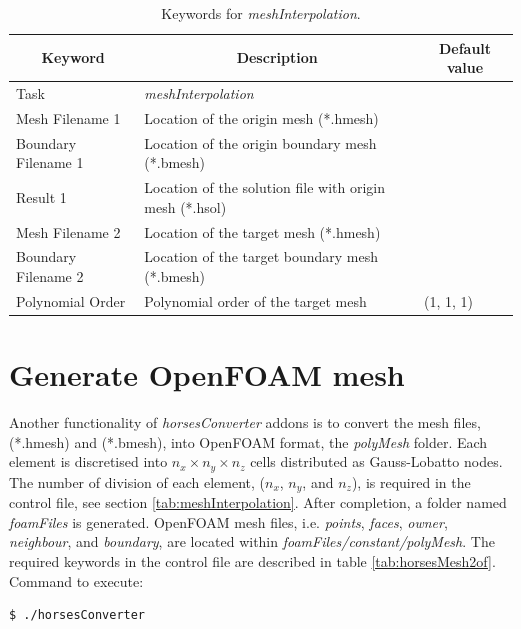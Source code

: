 \documentclass[a4paper,10pt]{report}
\begin{document}
\begin{longtable}{|p{4cm}|p{10cm}|p{2.2cm}|}
\caption{Keywords for \textit{meshInterpolation}.} \label{tab:mappingresult} \\
\hline
\multicolumn{1}{|c|}{\textbf{Keyword}} & \multicolumn{1}{c|}{\textbf{Description}} & \multicolumn{1}{c|}{\textbf{Default value}} \\ \hline
\endfirsthead

Task 	        		& \textit{meshInterpolation} 						&  \\ \hline
Mesh Filename 1 		& Location of the origin mesh (*.hmesh) 	&  \\ \hline
Boundary Filename 1 	& Location of the origin boundary mesh (*.bmesh) 	&  \\ \hline
Result 1 			& Location of the solution file with origin mesh (*.hsol) 	&  \\ \hline
Mesh Filename 2 		& Location of the target mesh (*.hmesh) 	&  \\ \hline
Boundary Filename 2 	& Location of the target boundary mesh (*.bmesh) 	&  \\ \hline
Polynomial Order 	& Polynomial order of the target mesh 	& (1, 1, 1) \\ \hline
\end{longtable}

\section{Generate OpenFOAM mesh} \label{tab:horsesMesh2OF}
Another functionality of \textit{horsesConverter} addons is to convert the mesh files, (*.hmesh) and (*.bmesh), into OpenFOAM format, the \textit{polyMesh} folder. Each element is discretised into $n_x \times n_y \times n_z$ cells distributed as Gauss-Lobatto nodes. The number of division of each element, ($n_x$, $n_y$, and $n_z$), is required in the control file, see section \ref{tab:meshInterpolation}. After completion, a folder named \emph{foamFiles} is generated. OpenFOAM mesh files, i.e. \textit{points}, \textit{faces}, \textit{owner}, \textit{neighbour}, and \textit{boundary}, are located within \emph{foamFiles/constant/polyMesh}. The required keywords in the control file are described in table \ref{tab:horsesMesh2of}. Command to execute:

\begin{lstlisting}[language=bash]
	$ ./horsesConverter
\end{lstlisting}
\end{document}
